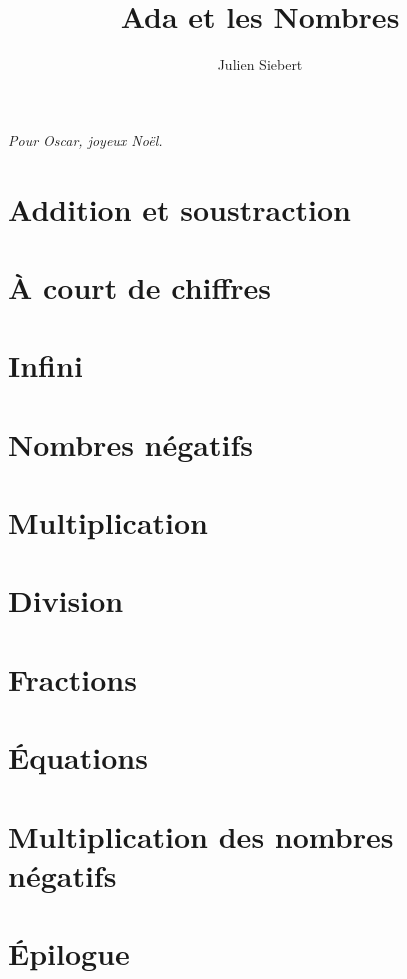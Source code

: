 \documentclass[a5paper,11pt,onecolumn]{book}
\title{Ada et les Nombres}
\author{Julien Siebert}
\begin{document}
\maketitle
\textit{Pour Oscar, joyeux Noël.}
\chapter{}

\chapter[]{Addition et soustraction}

\chapter[]{À court de chiffres}

\chapter[]{Infini}

\chapter[]{Nombres négatifs}

\chapter[]{Multiplication}

\chapter[]{Division}

\chapter[]{Fractions}

\chapter[]{Équations}

\chapter[]{Multiplication des nombres négatifs}

\chapter[]{Épilogue}

\end{document}
